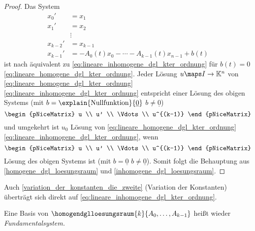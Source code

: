 \begin{proof}
  Das System 
  \begin{align*}
    x_0'&=x_1\\
    x_1'&=x_2\\
    &\vdots\\
    x_{k-2}'&=x_{k-1}\\
    x_{k-1}'&=-A_0(t)x_0-\dotsb-A_{k-1}(t)x_{n-1}+b(t)
  \end{align*}
  ist nach  äquivalent zu \eqref{eq:lineare_inhomogene_dgl_kter_ordnung} \bzw für \( b(t)=0 \) \eqref{eq:lineare_homogene_dgl_kter_ordnung}. Jeder Lösung \( u\maps I\to \mathbb{K}^n \) von \eqref{eq:lineare_homogene_dgl_kter_ordnung} \bzw \eqref{eq:lineare_inhomogene_dgl_kter_ordnung} entspricht einer Lösung des obigen Systems (mit \( b=\explain{\text{Nullfunktion}}{\underline{0}} \) \bzw \( b\neq \underline{0} \))
  \begin{equation*}
    \begin{pNiceMatrix} u \\ u' \\ \Vdots \\ u^{(k-1)} \end{pNiceMatrix}  
  \end{equation*}
  und umgekehrt ist \( u_0 \) Lösung von \eqref{eq:lineare_homogene_dgl_kter_ordnung} \bzw \eqref{eq:lineare_inhomogene_dgl_kter_ordnung}, wenn
  \begin{equation*}
    \begin{pNiceMatrix} u \\ u' \\ \Vdots \\ u^{(k-1)} \end{pNiceMatrix}  
  \end{equation*}
  Lösung des obigen Systems ist (mit \( b=\underline{0} \) \bzw \( b\neq \underline{0} \)). Somit folgt die Behauptung aus \ref{homogene_dgl_loesungsraum} und \ref{inhomogene_dgl_loesungsraum}.
\end{proof}
\begin{bemerkung*}
  Auch \ref{variation_der_konstanten_die_zweite} (Variation der Konstanten) überträgt sich direkt auf \eqref{eq:lineare_inhomogene_dgl_kter_ordnung}.
\end{bemerkung*}
\begin{notation*}
  Eine Basis von \( \homogendglloesungsraum{k}{A_0,\dotsc,A_{k-1}} \) heißt wieder \emph{Fundamentalsystem.}
\end{notation*}
